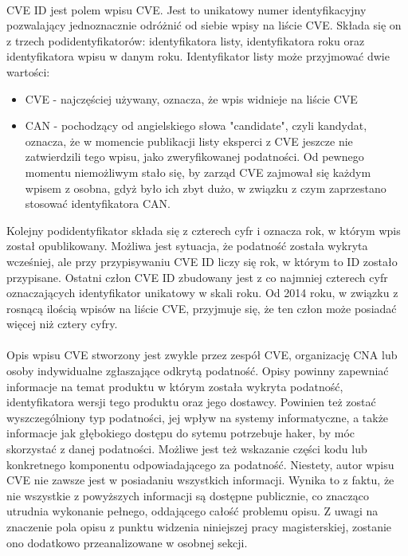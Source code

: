 \documentclass[a4paper,12pt,twoside]{article}
\begin{document}
\paragraph{}
CVE ID jest polem wpisu CVE. Jest to unikatowy numer identyfikacyjny pozwalający jednoznacznie odróżnić od siebie wpisy na liście CVE. Składa się on z trzech podidentyfikatorów: identyfikatora listy, identyfikatora roku oraz identyfikatora wpisu w danym roku. Identyfikator listy może przyjmować dwie wartości:
\begin{itemize}
\item CVE - najczęściej używany, oznacza, że wpis widnieje na liście CVE
\item CAN - pochodzący od angielskiego słowa "candidate", czyli kandydat, oznacza, że w momencie publikacji listy eksperci z CVE jeszcze nie zatwierdzili tego wpisu, jako zweryfikowanej podatności. Od pewnego momentu niemożliwym stało się, by zarząd CVE zajmował się każdym wpisem z osobna, gdyż było ich zbyt dużo, w związku z czym zaprzestano stosować identyfikatora CAN.
\end{itemize}
Kolejny podidentyfikator składa się z czterech cyfr i oznacza rok, w którym wpis został opublikowany. Możliwa jest sytuacja, że podatność została wykryta wcześniej, ale przy przypisywaniu CVE ID liczy się rok, w którym to ID zostało przypisane.
\newline Ostatni człon CVE ID zbudowany jest z co najmniej czterech cyfr oznaczających identyfikator unikatowy w skali roku. Od 2014 roku, w związku z rosnącą ilością wpisów na liście CVE, przyjmuje się, że ten człon może posiadać więcej niż cztery cyfry. 
\paragraph{}
Opis wpisu CVE stworzony jest zwykle przez zespół CVE, organizację CNA lub osoby indywidualne zgłaszające odkrytą podatność. Opisy powinny zapewniać informacje na temat produktu w którym została wykryta podatność, identyfikatora wersji tego produktu oraz jego dostawcy. Powinien też zostać wyszczególniony typ podatności, jej wpływ na systemy informatyczne, a także informacje jak głębokiego dostępu do sytemu potrzebuje haker, by móc skorzystać z danej podatności. Możliwe jest też wskazanie części kodu lub konkretnego komponentu odpowiadającego za podatność. Niestety, autor wpisu CVE nie zawsze jest w posiadaniu wszystkich informacji. Wynika to z faktu, że nie wszystkie z powyższych informacji są dostępne publicznie, co znacząco utrudnia wykonanie pełnego, oddającego całość problemu opisu. Z uwagi na znaczenie pola opisu z punktu widzenia niniejszej pracy magisterskiej, zostanie ono dodatkowo przeanalizowane w osobnej sekcji.
\end{document}
